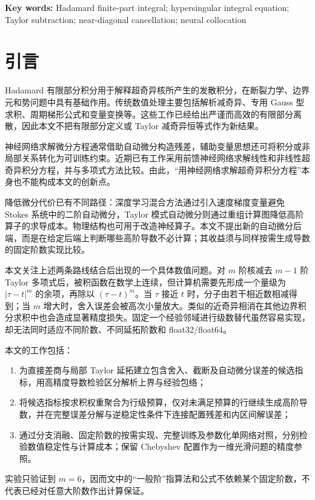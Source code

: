 \documentclass[UTF8,fontset=none,10.5pt,a4paper]{ctexart}
\numberwithin{equation}{section}
\begin{document}
\noindent\textbf{Key words:} Hadamard finite-part integral; hypersingular integral equation; Taylor subtraction; near-diagonal cancellation; neural collocation

\section{引言}

Hadamard 有限部分积分用于解释超奇异核所产生的发散积分，在断裂力学、边界元和势问题中具有基础作用。传统数值处理主要包括解析减奇异、专用 Gauss 型求积、周期梯形公式和变量变换等\cite{Toh1994,Monegato1996,Carley2009,Sidi2014,Sidi2021,Sidi2022,Sidi2024}。这些工作已经给出严谨而高效的有限部分离散，因此本文不把有限部分定义或 Taylor 减奇异恒等式作为新结果。

神经网络求解微分方程通常借助自动微分构造残差\cite{Raissi2019,Baydin2018}，辅助变量思想还可将积分或非局部关系转化为可训练约束\cite{Yuan2022}。近期已有工作采用前馈神经网络求解线性和非线性超奇异积分方程，并与多项式方法比较\cite{Rezaei2025}。由此，“用神经网络求解超奇异积分方程”本身也不能构成本文的创新点。

降低微分代价已有不同路径：深度学习混合方法通过引入速度梯度变量避免 Stokes 系统中的二阶自动微分\cite{Yang2026Stokes}，Taylor 模式自动微分则通过重组计算图降低高阶算子的求导成本\cite{Dangel2025}。物理结构也可用于改造神经算子\cite{Liu2026}。本文不提出新的自动微分后端，而是在给定后端上判断哪些高阶导数不必计算；其收益须与同样按需生成导数的固定阶数实现比较。

本文关注上述两条路线结合后出现的一个具体数值问题。对 $m$ 阶核减去 $m-1$ 阶 Taylor 多项式后，被积函数在数学上连续，但计算机需要先形成一个量级为 $|\tau-t|^m$ 的余项，再除以 $(\tau-t)^m$。当 $\tau$ 接近 $t$ 时，分子由若干相近数相减得到；当 $m$ 增大时，舍入误差会被高次小量放大。类似的近奇异相消在其他边界积分求积中也会造成显著精度损失\cite{Krantz2026}。固定一个经验邻域进行级数替代虽然容易实现，却无法同时适应不同阶数、不同延拓阶数和 float32/float64。

本文的工作包括：
\begin{enumerate}
  \item 为直接差商与局部 Taylor 延拓建立包含舍入、截断及自动微分误差的候选指标，用高精度导数检验区分解析上界与经验包络；
  \item 将候选指标按求积权重聚合为行级预算，仅对未满足预算的行继续生成高阶导数，并在完整误差分解与逆稳定性条件下连接配置残差和内区间解误差；
  \item 通过分支消融、固定阶数的按需实现、完整训练及参数化单网络对照，分别检验数值稳定性与计算成本；保留 Chebyshev 配置作为一维光滑问题的精度参照。
\end{enumerate}
实验只验证到 $m=6$，因而文中的“一般阶”指算法和公式不依赖某个固定阶数，不代表已经对任意大阶数作出计算保证。
\end{document}
